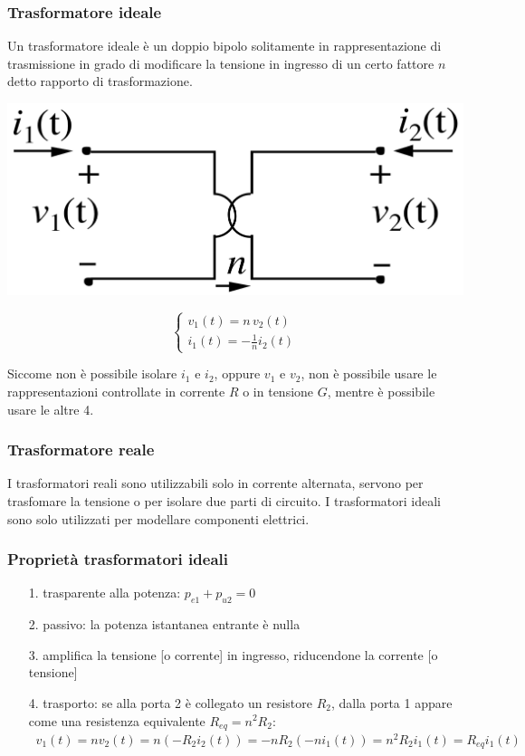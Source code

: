 \documentclass[a4paper]{article}
\begin{document}
\subsubsection*{Trasformatore ideale}
Un trasformatore ideale è un doppio bipolo solitamente in rappresentazione di trasmissione in grado di modificare la tensione
in ingresso di un certo fattore \(n\) detto rapporto di trasformazione.

\begin{center}
	\begin{minipage}{0.3\textwidth}
		\centering
		\includegraphics[width=\textwidth]{trasformatore.png}
	\end{minipage}
	\begin{minipage}{0.4\textwidth}
		\[\begin{cases}
			\displaystyle v_1(t) = n \, v_2(t) \\[7pt]
			\displaystyle i_1(t) = -\frac{1}{n} i_2(t)
		\end{cases}\]
	\end{minipage}
\end{center}
Siccome non è possibile isolare \(i_1\) e \(i_2\), oppure \(v_1\) e \(v_2\), non è possibile usare le rappresentazioni controllate
in corrente \(R\) o in tensione \(G\), mentre è possibile usare le altre 4.

\subsubsection*{Trasformatore reale}
I trasformatori reali sono utilizzabili solo in corrente alternata, servono per trasfomare la tensione o per isolare due parti
di circuito. I trasformatori ideali sono solo utilizzati per modellare componenti elettrici.

\subsubsection*{Proprietà trasformatori ideali}
\begin{itemize}
	\item[1.] trasparente alla potenza: \(p_{e1} + p_{u2} = 0\)
	\item[2.] passivo: la potenza istantanea entrante è nulla
	\item[3.] amplifica la tensione [o corrente] in ingresso, riducendone la corrente [o tensione]
	\item[4.] trasporto: se alla porta 2 è collegato un resistore \(R_2\), dalla porta 1 appare come una resistenza equivalente
	\(R_{eq} = n^2 R_2\): \(\;\;v_1(t) = n v_2(t) = n (-R_2 i_2(t)) = - n R_2(-n i_1(t)) = n^2 R_2 i_1(t) = R_{eq} i_1(t)\)
\end{itemize}
\end{document}
